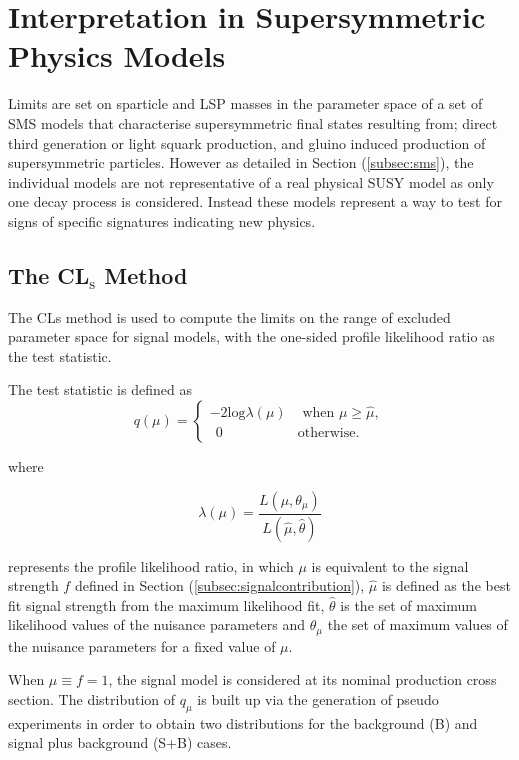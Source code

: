 \section{Interpretation in Supersymmetric Physics Models}
\label{sec:resultsms}

Limits are set on sparticle and \ac{LSP} masses in the parameter space of a set of \ac{SMS} models that characterise supersymmetric final states resulting from; direct third generation or light squark production, and gluino induced production of supersymmetric particles. However as detailed in Section (\ref{subsec:sms}), the individual models are not representative of a real physical \ac{SUSY} model as only one decay process is considered. Instead these models represent a way to test for signs of specific signatures indicating new physics. 

\subsection{The CL$_{\text{s}}$ Method}

The CLs method \cite{0954-3899-28-10-313}\cite{Junk1999435}\cite{Read:451614} is used to compute the limits on the range of excluded parameter space for signal models, with the one-sided profile likelihood ratio as the test statistic.

The test statistic is defined as
\begin{equation}
  q(\mu)=\begin{cases}
    -2\text{log}\lambda(\mu) & \text{ when $\mu \geq \hat{\mu}$},\\
      \ \ 0 & \text{otherwise}.
  \end{cases}
\end{equation}

where 

\begin{equation}
\lambda(\mu) = \frac{L(\mu,\theta_{\mu})}{L(\hat{\mu},\hat{\theta})}
\end{equation}

represents the profile likelihood ratio, in which $\mu$ is equivalent to the signal strength $f$ defined in Section (\ref{subsec:signalcontribution}), $\hat{\mu}$ is defined as the best fit signal strength from the maximum likelihood fit, $\hat{\theta}$ is the set of maximum likelihood values of the nuisance parameters and $\theta_{\mu}$ the set of maximum values of the nuisance parameters for a fixed value of $\mu$.

When $\mu \equiv f = 1$, the signal model is considered at its nominal production cross section. The distribution of $q_{\mu}$ is built up via the generation of pseudo experiments in order to obtain two distributions for the background (B) and signal plus background (S+B) cases.

